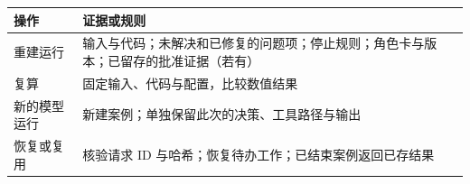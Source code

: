 \begin{tabular}{@{}P{3.0cm}P{9.5cm}@{}}
\toprule
\textbf{操作} & \textbf{证据或规则} \\
\midrule
重建运行 & 输入与代码；未解决和已修复的问题项；停止规则；角色卡与版本；已留存的批准证据（若有） \\
复算 & 固定输入、代码与配置，比较数值结果 \\
新的模型运行 & 新建案例；单独保留此次的决策、工具路径与输出 \\
恢复或复用 & 核验请求 ID 与哈希；\newline 恢复待办工作；已结束案例返回已存结果 \\
\bottomrule
\end{tabular}
